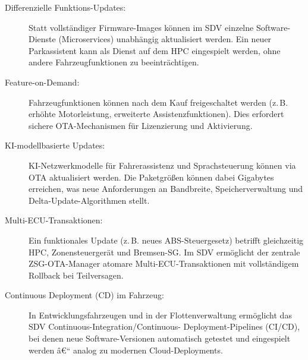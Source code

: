 ﻿\documentclass[12pt,a4paper,twoside]{article}
\begin{document}
\begin{description}
  \item[Differenzielle Funktions-Updates:] Statt vollständiger Firmware-Images
    können im SDV einzelne Software-Dienste (Microservices) unabhängig aktualisiert
    werden. Ein neuer Parkassistent kann als Dienst auf dem HPC eingespielt werden,
    ohne andere Fahrzeugfunktionen zu beeinträchtigen.
  \item[Feature-on-Demand:] Fahrzeugfunktionen können nach dem Kauf freigeschaltet
    werden (z.\,B. erhöhte Motorleistung, erweiterte Assistenzfunktionen). Dies
    erfordert sichere OTA-Mechanismen für Lizenzierung und Aktivierung.
  \item[KI-modellbasierte Updates:] KI-Netzwerkmodelle für Fahrerassistenz
    und Sprachsteuerung können via OTA aktualisiert werden. Die Paketgrößen können
    dabei Gigabytes erreichen, was neue Anforderungen an Bandbreite,
    Speicherverwaltung und Delta-Update-Algorithmen stellt.
  \item[Multi-ECU-Transaktionen:] Ein funktionales Update (z.\,B. neues ABS-Steuer\-gesetz)
    betrifft gleichzeitig HPC, Zonensteuergerät und Bremsen-SG. Im SDV ermöglicht
    der zentrale ZSG-OTA-Manager atomare Multi-ECU-Transaktionen mit vollständigem
    Rollback bei Teilversagen.
  \item[Continuous Deployment (CD) im Fahrzeug:] In Entwicklungsfahrzeugen und
    in der Flottenverwaltung ermöglicht das SDV Continuous-Integration/Continuous-
    Deploy\-ment-Pipelines (CI/CD), bei denen neue Software-Versionen automatisch
    getestet und eingespielt werden â€“ analog zu modernen Cloud-Deployments.
\end{description}
\end{document}

